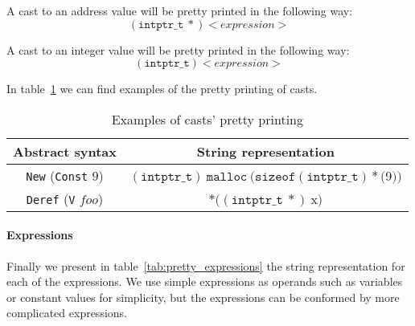 A cast to an address value will be pretty printed in the following way:
\begin{equation*}
(\mathtt{intptr\_t}\ *) <expression>
\end{equation*}

A cast to an integer value will be pretty printed in the following way:
\begin{equation*}
(\mathtt{intptr\_t}) <expression>
\end{equation*}

In table~\ref{tab:pretty_casts} we can find examples of the pretty printing of casts.

\begin{table}[h!]
\centering
\begin{tabular}{|c|c|}
  \hline
  \textbf{Abstract syntax} & \textbf{String representation} \\ [0.5ex]
  \hline \hline
  \verb|New| (\verb|Const| $9$) & $(\mathtt{intptr\_t})\ \mathtt{malloc}\ (\mathtt{sizeof}(\mathtt{intptr\_t}) * ($9$))$ \\
  \verb|Deref| (\verb|V| $foo$) & $*((\mathtt{intptr\_t}\ *)\ $x$)$ \\
  \hline
\end{tabular}

\caption{Examples of casts' pretty printing}
\label{tab:pretty_casts}
\end{table}


\paragraph{Expressions}
Finally we present in table~\ref{tab:pretty_expressions} the string representation for each of the expressions.
We use simple expressions as operands such as variables or constant values for simplicity, but the expressions can be conformed by more complicated expressions.

